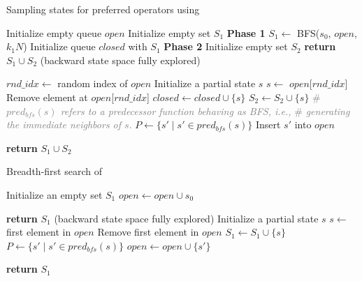 \documentclass[ppgc,diss,english]{iiufrgs}
\begin{document}
\begin{algorithm}[tb]
\caption{Sampling states for preferred operators using \bfsrs}
\label{alg:sampling-po}
\begin{algorithmic}[1]
  \State Initialize empty queue $open$
  \State Initialize empty set $S_{1}$
  \State \textbf{Phase 1}
  \State $S_{1} \gets$ BFS($s_{0}$, $open$, $k_1N$)
  \State Initialize queue $closed$ with $S_{1}$
  \State \textbf{Phase 2}
  \State Initialize empty set $S_{2}$
      \State \textbf{return} $S_{1} \cup S_{2}$ (backward state space fully explored)
    \EndIf

    \State $rnd\_idx \gets$ random index of $open$
    \State Initialize a partial state $s$
    \State $s \gets$ $open$[$rnd\_idx$]
    \State Remove element at $open$[$rnd\_idx$]
    \State $closed \gets closed \cup \{s\}$
    \State $S_{2} \gets S_{2} \cup \{s\}$
    \State \textcolor{gray}{\# \emph{$pred_{bfs}(s)$ refers to a predecessor function behaving as BFS, i.e.,}}
    \State \textcolor{gray}{\# \emph{generating the immediate neighbors of $s$}.}
    \State $P \gets \{s' \mid s' \in pred_{bfs}(s)\}$
        \State Insert $s'$ into $open$
      \EndIf
    \EndFor
  \EndWhile

  \State \textbf{return} $S_{1} \cup S_{2}$
\EndProcedure
\end{algorithmic}
\end{algorithm}

\begin{algorithm}[tb]
\caption{Breadth-first search of \bfsrs}
\label{alg:sampling-bfs}
\begin{algorithmic}[1]
  \State Initialize an empty set $S_{1}$
  \State $open \gets open \cup s_{0}$

      \State \textbf{return} $S_{1}$ (backward state space fully explored)
    \EndIf
    \State Initialize a partial state $s$
    \State $s \gets$ first element in $open$
    \State Remove first element in $open$
    \State $S_{1} \gets S_{1} \cup \{s\}$
    \State $P \gets \{s' \mid s' \in pred_{bfs}(s)\}$
        \State $open \gets open \cup \{s'\}$
      \EndIf
    \EndFor
  \EndWhile

  \State \textbf{return} $S_{1}$
\EndProcedure
\end{algorithmic}
\end{algorithm}
\end{document}
